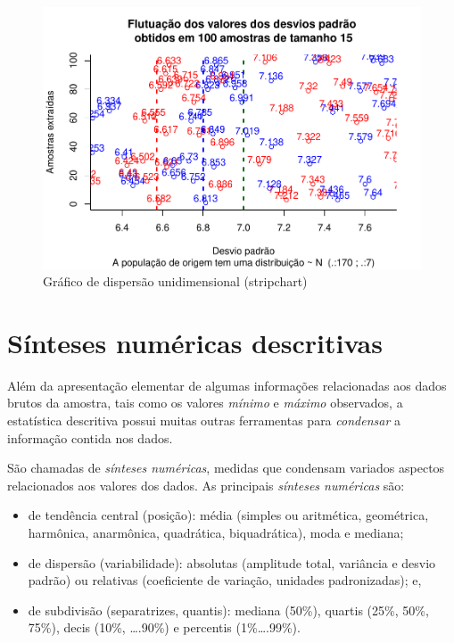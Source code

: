 \documentclass[
]{book}
\providecommand{\tightlist}{%
  \setlength{\itemsep}{0pt}\setlength{\parskip}{0pt}}
\begin{document}
\begin{figure}

{\centering \includegraphics{apostila_files/figure-latex/unnamed-chunk-33-1} 

}

\caption{Gráfico de dispersão unidimensional (stripchart)}\label{fig:unnamed-chunk-33}
\end{figure}

\hypertarget{suxednteses-numuxe9ricas-descritivas}{%
\section{Sínteses numéricas descritivas}\label{suxednteses-numuxe9ricas-descritivas}}

Além da apresentação elementar de algumas informações relacionadas aos dados brutos da amostra, tais como os valores \emph{mínimo} e \emph{máximo} observados, a estatística descritiva possui muitas outras ferramentas para \emph{condensar} a informação contida nos dados.

São chamadas de \emph{sínteses numéricas}, medidas que condensam variados aspectos relacionados aos valores dos dados. As principais \emph{sínteses numéricas} são:

\begin{itemize}
\tightlist
\item
  de tendência central (posição): média (simples ou aritmética, geométrica, harmônica, anarmônica, quadrática, biquadrática), moda e mediana;
\item
  de dispersão (variabilidade): absolutas (amplitude total, variância e desvio padrão) ou relativas (coeficiente de variação, unidades padronizadas); e,
\item
  de subdivisão (separatrizes, quantis): mediana (50\%), quartis (25\%, 50\%, 75\%), decis (10\%, \ldots.90\%) e percentis (1\%\ldots.99\%).
\end{itemize}
\end{document}
